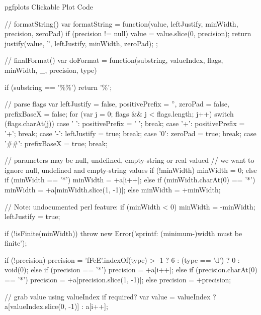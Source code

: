 \begin{insDLJS}[processAnnotatedPlot]{\jobname}{pgfplots Clickable Plot Code}
{    // formatString()
    var formatString = function(value, leftJustify, minWidth, precision, zeroPad) {
        if (precision != null) {
            value = value.slice(0, precision);
        }
        return justify(value, '', leftJustify, minWidth, zeroPad);
    };

    // finalFormat()
    var doFormat = function(substring, valueIndex, flags, minWidth, _, precision, type) {
        if (substring == '\%\%') return '\%';

        // parse flags
        var leftJustify = false, positivePrefix = '', zeroPad = false, prefixBaseX = false;
        for (var j = 0; flags && j < flags.length; j++) switch (flags.charAt(j)) {
            case ' ': positivePrefix = ' '; break;
            case '+': positivePrefix = '+'; break;
            case '-': leftJustify = true; break;
            case '0': zeroPad = true; break;
            case '##': prefixBaseX = true; break;
        }

        // parameters may be null, undefined, empty-string or real valued
        // we want to ignore null, undefined and empty-string values
        if (!minWidth) {
            minWidth = 0;
        } else if (minWidth == '*') {
            minWidth = +a[i++];
        } else if (minWidth.charAt(0) == '*') {
            minWidth = +a[minWidth.slice(1, -1)];
        } else {
            minWidth = +minWidth;
        }

        // Note: undocumented perl feature:
        if (minWidth < 0) {
            minWidth = -minWidth;
            leftJustify = true;
        }

        if (!isFinite(minWidth)) {
            throw new Error('sprintf: (minimum-)width must be finite');
        }

        if (!precision) {
            precision = 'fFeE'.indexOf(type) > -1 ? 6 : (type == 'd') ? 0 : void(0);
        } else if (precision == '*') {
            precision = +a[i++];
        } else if (precision.charAt(0) == '*') {
            precision = +a[precision.slice(1, -1)];
        } else {
            precision = +precision;
        }

        // grab value using valueIndex if required?
        var value = valueIndex ? a[valueIndex.slice(0, -1)] : a[i++];

}}
\end{insDLJS}
